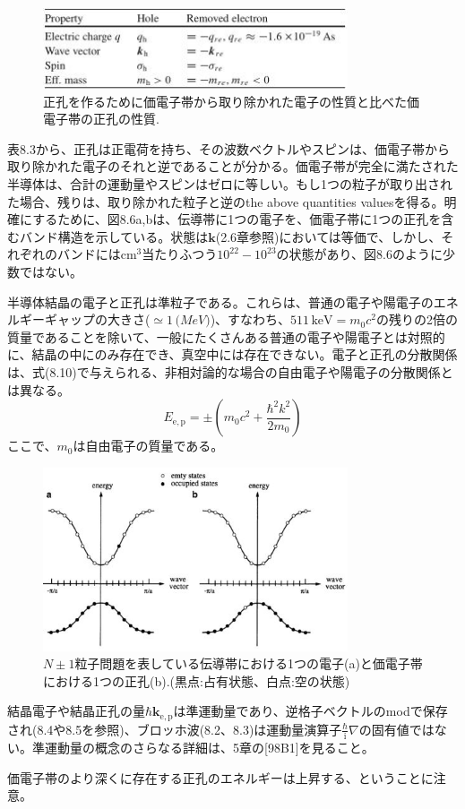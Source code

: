 \documentclass[11pt,a4j,uplatex]{jsarticle}
\begin{document}
\setcounter{figure}{2}
\begin{figure}[b]
  \centering
  \includegraphics[clip,width=9cm]{8_3.JPG}
  \caption{正孔を作るために価電子帯から取り除かれた電子の性質と比べた価電子帯の正孔の性質.}
  \label{table8.3}
\end{figure}

表8.3から、正孔は正電荷を持ち、その波数ベクトルやスピンは、価電子帯から取り除かれた電子のそれと逆であることが分かる。価電子帯が完全に満たされた半導体は、合計の運動量やスピンはゼロに等しい。もし1つの粒子が取り出された場合、残りは、取り除かれた粒子と逆のthe above quantities valuesを得る。明確にするために、図8.6a,bは、伝導帯に1つの電子を、価電子帯に1つの正孔を含むバンド構造を示している。状態は$\bm{k}$(2.6章参照)においては等価で、しかし、それぞれのバンドには$\mathrm{cm}^3$当たりふつう$10^{22}-10^{23}$の状態があり、図8.6のように少数ではない。

半導体結晶の電子と正孔は準粒子である。これらは、普通の電子や陽電子のエネルギーギャップの大きさ($\simeq1\,\mathrm(MeV)$)、すなわち、$511\,\mathrm{keV}=m_0c^2$の残りの2倍の質量であることを除いて、一般にたくさんある普通の電子や陽電子とは対照的に、結晶の中にのみ存在でき、真空中には存在できない。電子と正孔の分散関係は、式(8.10)で与えられる、非相対論的な場合の自由電子や陽電子の分散関係とは異なる。
\begin{equation}
  E_{\mathrm{e,p}}=\pm\left(m_0c^2+\frac{\hbar^2k^2}{2m_0}\right)
  \tag{8.10}
\end{equation}
ここで、$m_0$は自由電子の質量である。

\renewcommand{\figurename}{図}%
\setcounter{figure}{5}
\begin{figure}[tb]
  \centering
  \includegraphics[clip,width=9cm]{8_6.JPG}
  \caption{$N\pm1$粒子問題を表している伝導帯における1つの電子(a)と価電子帯における1つの正孔(b).(黒点:占有状態、白点:空の状態)}
  \label{8.6}
\end{figure}

結晶電子や結晶正孔の量$\hbar\bm{k}_{\mathrm{e,p}}$は準運動量であり、逆格子ベクトルのmodで保存され(8.4や8.5を参照)、ブロッホ波(8.2、8.3)は運動量演算子$\frac{\hbar}{\mathrm{i}}\nabla$の固有値ではない。準運動量の概念のさらなる詳細は、5章の[98B1]を見ること。

価電子帯のより深くに存在する正孔のエネルギーは上昇する、ということに注意。
\end{document}
